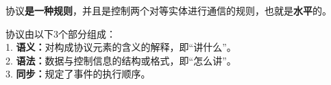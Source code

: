 协议\textbf{是一种规则}，并且是控制两个对等实体进行通信的规则，也就是\textbf{水平}的。

协议由以下3个部分组成：\\
1. \textbf{语义：}对构成协议元素的含义的解释，即``{讲什么}''。\\
2. \textbf{语法：}数据与控制信息的结构或格式，即``{怎么讲}''。\\
3. \textbf{同步：}规定了事件的{执行顺序}。
